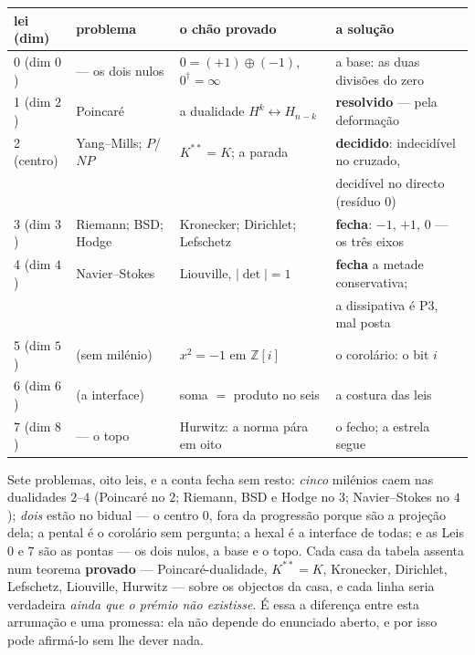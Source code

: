\documentclass[11pt,a4paper]{article}
\newcommand{\dg}{^{\dagger}}
\begin{document}
\begin{center}\small
\renewcommand{\arraystretch}{1.25}
\begin{tabular}{@{}llll@{}}
\toprule
lei (dim) & problema & o chão provado & a solução \\
\midrule
0 (dim $0$) & --- os dois nulos & $0=(+1)\oplus(-1)$, $0\dg=\infty$ & a base: as duas divisões do zero \\
1 (dim $2$) & Poincaré & a dualidade $H^{k}\!\leftrightarrow\!H_{n-k}$ & \textbf{resolvido} --- pela deformação \\
2 (centro) & Yang--Mills; $P$/$NP$ & $K^{**}=K$; a parada & \textbf{decidido}: indecidível no cruzado, \\
 & & & \quad decidível no directo (resíduo $0$) \\
3 (dim $3$) & Riemann; BSD; Hodge & Kronecker; Dirichlet; Lefschetz & \textbf{fecha}: $-1$, $+1$, $0$ --- os três eixos \\
4 (dim $4$) & Navier--Stokes & Liouville, $|\det|=1$ & \textbf{fecha} a metade conservativa; \\
 & & & \quad a dissipativa é P3, mal posta \\
5 (dim $5$) & (sem milénio) & $x^{2}=-1$ em $\mathbb Z[i]$ & o corolário: o bit $i$ \\
6 (dim $6$) & (a interface) & soma $=$ produto no seis & a costura das leis \\
7 (dim $8$) & --- o topo & Hurwitz: a norma pára em oito & o fecho; a estrela segue \\
\bottomrule
\end{tabular}
\end{center}

\noindent Sete problemas, oito leis, e a conta fecha sem resto: \emph{cinco} milénios caem nas
dualidades $2$--$4$ (Poincaré no $2$; Riemann, BSD e Hodge no $3$; Navier--Stokes no $4$);
\emph{dois} estão no bidual --- o centro $0$, fora da progressão porque são a projeção dela; a
pental é o corolário sem pergunta; a hexal é a interface de todas; e as Leis $0$ e $7$ são as pontas
--- os dois nulos, a base e o topo. Cada casa da tabela assenta num teorema \textbf{provado} ---
Poincaré-dualidade, $K^{**}=K$, Kronecker, Dirichlet, Lefschetz, Liouville, Hurwitz --- sobre os
objectos da casa, e cada linha seria verdadeira \emph{ainda que o prémio não existisse}. É essa a
diferença entre esta arrumação e uma promessa: ela não depende do enunciado aberto, e por isso pode
afirmá-lo sem lhe dever nada.
\end{document}
